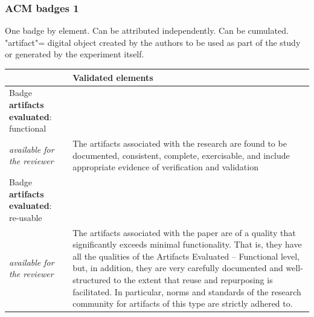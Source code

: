 \begin{frame}
\frametitle{ACM badges 1}

One badge by element. Can be attributed independently. Can be cumulated.\\
"artifact"= digital object created by the authors to be used as part of the study or generated by the experiment itself.

\begin{tabular}{|p{5cm}|p{9cm}|}
  \hline
 & \cellcolor{bl1}Validated elements \\
  \hline 
  Badge  \textbf{artifacts evaluated}: functional \\ \textit{available for the reviewer}  & The artifacts associated with the research are found to be documented, consistent, complete, exercisable, and include appropriate evidence of verification and validation \\
\hline
  Badge \textbf{artifacts evaluated}: re-usable \\ \textit{available for the reviewer}   &  The artifacts associated with the paper are of a quality that significantly exceeds minimal functionality. That is, they have all the qualities of the Artifacts Evaluated – Functional level, but, in addition, they are very carefully documented and well-structured to the extent that reuse and repurposing is facilitated. In particular, norms and standards of the research community for artifacts of this type are strictly adhered to. \\
  \hline
\end{tabular}
\end{frame}





